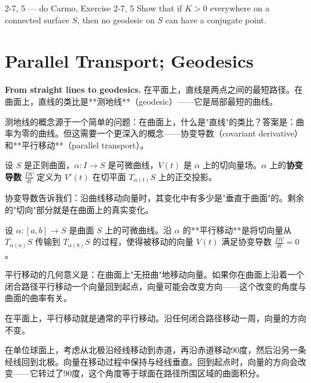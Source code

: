 \begin{exercise}{2-7, 5 — do Carmo, Exercise 2-7, 5}
Show that if $K > 0$ everywhere on a connected surface $S$, then no geodesic on $S$ can have a conjugate point.
\end{exercise}

\section{Parallel Transport; Geodesics}\label{sec:geodesics}

\textbf{From straight lines to geodesics.} 在平面上，直线是两点之间的最短路径。在曲面上，直线的类比是**测地线**（geodesic）——它是局部最短的曲线。

测地线的概念源于一个简单的问题：在曲面上，什么是"直线"的类比？答案是：曲率为零的曲线。但这需要一个更深入的概念——协变导数（covariant derivative）和**平行移动**（parallel transport）。

\begin{Definition}[协变导数]\label{def:covariant-derivative}
设 $S$ 是正则曲面，$\alpha: I \to S$ 是可微曲线，$V(t)$ 是 $\alpha$ 上的切向量场。$\alpha$ 上的\textbf{协变导数} $\frac{DV}{dt}$ 定义为 $V'(t)$ 在切平面 $T_{\alpha(t)}S$ 上的正交投影。
\end{Definition}

协变导数告诉我们：沿曲线移动向量时，其变化中有多少是"垂直于曲面"的。剩余的"切向"部分就是在曲面上的真实变化。

\begin{Definition}[平行移动]\label{def:parallel-transport}
设 $\alpha: [a,b] \to S$ 是曲面 $S$ 上的可微曲线。沿 $\alpha$ 的**平行移动**是将切向量从 $T_{\alpha(a)}S$ 传输到 $T_{\alpha(b)}S$ 的过程，使得被移动的向量 $V(t)$ 满足协变导数 $\frac{DV}{dt} = 0$。
\end{Definition}

平行移动的几何意义是：在曲面上"无扭曲"地移动向量。如果你在曲面上沿着一个闭合路径平行移动一个向量回到起点，向量可能会改变方向——这个改变的角度与曲面的曲率有关。

\begin{Example}[平面上的平行移动]\label{ex:plane-parallel}
在平面上，平行移动就是通常的平行移动。沿任何闭合路径移动一周，向量的方向不变。
\end{Example}

\begin{Example}[球面上的平行移动]\label{ex:sphere-parallel}
在单位球面上，考虑从北极沿经线移动到赤道，再沿赤道移动90度，然后沿另一条经线回到北极。向量在移动过程中保持与经线垂直。回到起点时，向量的方向会改变——它转过了90度，这个角度等于球面在路径所围区域的曲面积分。
\end{Example}

